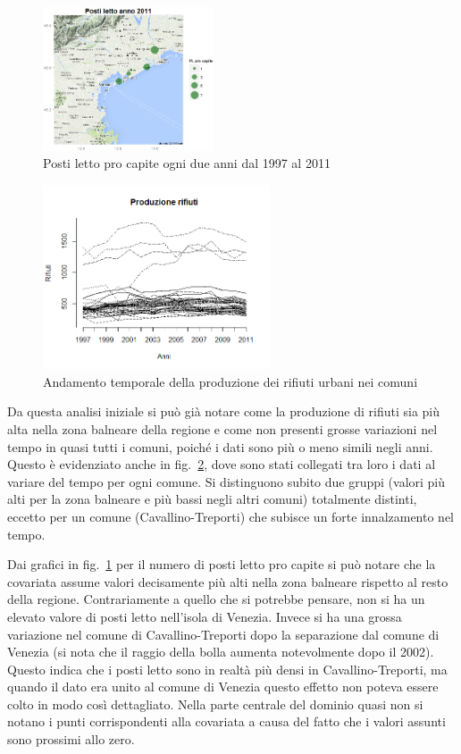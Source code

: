 \documentclass[a4paper,11pt,twoside,openright]{book}							%
\begin{document}
\begin{figure}[H]
	\includegraphics[trim=0cm 0cm 0cm 0cm,clip=true,width=0.45\textwidth]{Immagini/venezia_dati/PL2011.png}
	\caption{Posti letto pro capite ogni due anni dal 1997 al 2011}
	\label{fig:Ven_bubblePL}
\end{figure}
\newpage
\begin{figure}[t]
\centering
	\includegraphics[width=0.60\textwidth]{Immagini/Matplot.png}   
 \caption{Andamento temporale della produzione dei rifiuti urbani nei comuni}
   \label{fig:Ven_matplot}
\end{figure}
Da questa analisi iniziale si può già notare come la produzione di rifiuti sia più alta nella zona balneare della regione e come non presenti grosse variazioni nel tempo in quasi tutti i comuni, poiché i dati sono più o meno simili negli anni. Questo è evidenziato anche in fig.~\ref{fig:Ven_matplot}, dove sono stati collegati tra loro i dati al variare del tempo per ogni comune. Si distinguono subito due gruppi (valori più alti per la zona balneare e più bassi negli altri comuni) totalmente distinti, eccetto per un comune (Cavallino-Treporti) che subisce un forte innalzamento nel tempo.

Dai grafici in fig.~\ref{fig:Ven_bubblePL} per il numero di posti letto pro capite si può notare che la covariata assume valori decisamente più alti nella zona balneare rispetto al resto della regione. Contrariamente a quello che si potrebbe pensare, non si ha un elevato valore di posti letto nell'isola di Venezia. Invece si ha una grossa variazione nel comune di Cavallino-Treporti dopo la separazione dal comune di Venezia (si nota che il raggio della bolla aumenta notevolmente dopo il 2002). Questo indica che i posti letto sono in realtà più densi in Cavallino-Treporti, ma quando il dato era unito al comune di Venezia questo effetto non poteva essere colto in modo così dettagliato. Nella parte centrale del dominio quasi non si notano i punti corrispondenti alla covariata a causa del fatto che i valori assunti sono prossimi allo zero.
\end{document}
